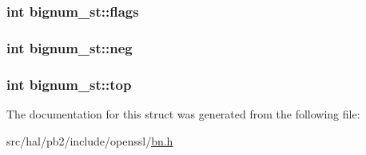 \subsubsection[{\texorpdfstring{flags}{flags}}]{\setlength{\rightskip}{0pt plus 5cm}int bignum\+\_\+st\+::flags}\hypertarget{structbignum__st_a7ab1fc90f994e4428dbf1f354cbc82b4}{}\label{structbignum__st_a7ab1fc90f994e4428dbf1f354cbc82b4}
\subsubsection[{\texorpdfstring{neg}{neg}}]{\setlength{\rightskip}{0pt plus 5cm}int bignum\+\_\+st\+::neg}\hypertarget{structbignum__st_a4bffe6c6b7a0f7fa9821b0339b7d126f}{}\label{structbignum__st_a4bffe6c6b7a0f7fa9821b0339b7d126f}
\subsubsection[{\texorpdfstring{top}{top}}]{\setlength{\rightskip}{0pt plus 5cm}int bignum\+\_\+st\+::top}\hypertarget{structbignum__st_acb2587e7e0ff144adee978acd5b362f6}{}\label{structbignum__st_acb2587e7e0ff144adee978acd5b362f6}


The documentation for this struct was generated from the following file\+:\begin{DoxyCompactItemize}
\item 
src/hal/pb2/include/openssl/\hyperlink{bn_8h}{bn.\+h}\end{DoxyCompactItemize}
